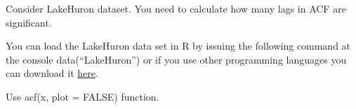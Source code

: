
\begin{question}
Consider LakeHuron dataset. You need to calculate how many lags in ACF are significant.

You can load the LakeHuron data set in R by issuing the following command at the console data(``LakeHuron'') or if you use other programming languages you can download it \href{https://github.com/vincentarelbundock/Rdatasets/blob/master/csv/datasets/LakeHuron.csv}{here}.
\end{question}

\begin{solution}
Use acf(x, plot = FALSE) function.
\end{solution}

